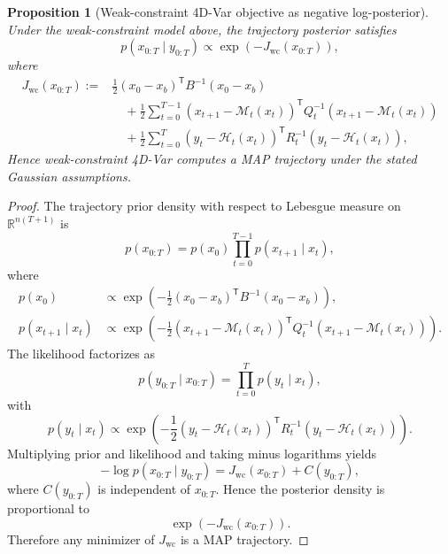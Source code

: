 \documentclass[10pt,a4paper]{amsart}
\newtheorem{proposition}{Proposition}
\newcommand{\R}{\mathbb{R}}
\newcommand{\parens}[1]{\left( #1 \right)}
\newcommand{\transpose}{^{\mathsf T}}
\newcommand{\xtraj}{x_{0:T}}
\newcommand{\ytraj}{y_{0:T}}
\begin{document}
\begin{proposition}[Weak-constraint 4D-Var objective as negative log-posterior]
\label{prop:weak-4dvar}
Under the weak-constraint model above, the trajectory posterior satisfies
\begin{equation}
p(\xtraj\mid \ytraj)
\propto
\exp\parens{-J_{\mathrm{wc}}(\xtraj)},
\end{equation}
where
\begin{align}
J_{\mathrm{wc}}(\xtraj)
:={}&
\frac12 (x_0-x_b)\transpose B^{-1}(x_0-x_b)
\nonumber\\
&\quad
+\frac12\sum_{t=0}^{T-1}
\parens{x_{t+1}-\mathcal M_t(x_t)}\transpose
Q_t^{-1}
\parens{x_{t+1}-\mathcal M_t(x_t)}
\nonumber\\
&\quad
+\frac12\sum_{t=0}^{T}
\parens{y_t-\mathcal H_t(x_t)}\transpose
R_t^{-1}
\parens{y_t-\mathcal H_t(x_t)},
\label{eq:weak-4dvar-cost}
\end{align}
Hence weak-constraint 4D-Var computes a MAP trajectory under the stated Gaussian assumptions.
\end{proposition}

\begin{proof}
The trajectory prior density with respect to Lebesgue measure on $\R^{n(T+1)}$ is
\[
p(\xtraj)
=
p(x_0)\prod_{t=0}^{T-1}p(x_{t+1}\mid x_t),
\]
where
\begin{align*}
p(x_0)
&\propto
\exp\!\left(
-\frac12 (x_0-x_b)\transpose B^{-1}(x_0-x_b)
\right),\\
p(x_{t+1}\mid x_t)
&\propto
\exp\!\left(
-\frac12
\parens{x_{t+1}-\mathcal M_t(x_t)}\transpose
Q_t^{-1}
\parens{x_{t+1}-\mathcal M_t(x_t)}
\right).
\end{align*}
The likelihood factorizes as
\[
p(\ytraj\mid \xtraj)
=
\prod_{t=0}^{T}p(y_t\mid x_t),
\]
with
\[
p(y_t\mid x_t)
\propto
\exp\!\left(
-\frac12
\parens{y_t-\mathcal H_t(x_t)}\transpose
R_t^{-1}
\parens{y_t-\mathcal H_t(x_t)}
\right).
\]
Multiplying prior and likelihood and taking minus logarithms yields
\[
-\log p(\xtraj\mid \ytraj)
=
J_{\mathrm{wc}}(\xtraj) + C(\ytraj),
\]
where $C(\ytraj)$ is independent of $\xtraj$. Hence the posterior density is proportional to
\[
\exp(-J_{\mathrm{wc}}(\xtraj)).
\]
Therefore any minimizer of $J_{\mathrm{wc}}$ is a MAP trajectory.
\end{proof}
\end{document}
